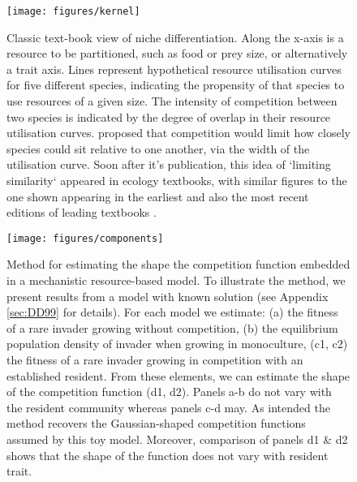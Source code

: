 \documentclass[a4paper,11pt]{article}
\begin{document}
\begin{figure}[h]
  \centering
  \texttt{[image: figures/kernel]}
  \caption{Classic text-book view of niche differentiation.  Along the
    x-axis is a resource to be partitioned, such as food or prey size,
    or alternatively a trait axis.  Lines represent hypothetical
    resource utilisation curves for five different species, indicating
    the propensity of that species to use resources of a given size.
    The intensity of competition between two species is indicated by
    the degree of overlap in their resource utilisation
    curves. \citet{MacArthur-1967} proposed that competition would
    limit how closely species could sit relative to one another, via
    the width of the utilisation curve. Soon after it's publication,
    this idea of `limiting similarity` appeared in ecology textbooks,
    with similar figures to the one shown appearing in the earliest
    and also the most recent editions of leading textbooks
    \citep{Begon-1986, Begon-2006, Krebs-1978, Krebs-2013,
      Ricklefs-1973, Ricklefs-1999}.}
  \label{fig:competition-kernels}
\end{figure}

\begin{figure}[h]
 \centering
 \texttt{[image: figures/components]}
 \caption{Method for estimating the shape the competition function embedded
  in a mechanistic resource-based model. To illustrate the method, we present
  results from a model with known solution \citep{Dieckmann-1999} (see Appendix
  \ref{sec:DD99} for details). For each
  model we estimate: (a) the fitness of a rare invader growing without competition,
  (b) the equilibrium population density of invader when growing in monoculture,
  (c1, c2) the fitness of a rare invader growing in competition with an established
  resident. From these elements, we can estimate the shape of the competition
  function (d1, d2). Panels a-b do not vary with the resident community whereas
  panels c-d may.  As intended the method recovers the Gaussian-shaped competition
  functions assumed by this toy model. Moreover, comparison of panels d1 \& d2
  shows that the shape of the function does not vary with resident trait.
  \label{fig:components}}
\end{figure}
\end{document}
